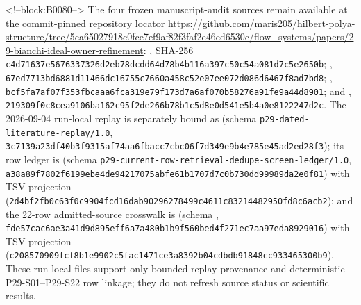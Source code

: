 \documentclass[11pt,a4paper]{article}
\begin{document}
<!--block:B0080-->
\begingroup\sloppy
The four frozen manuscript-audit sources remain available at the commit-pinned repository locator \url{https://github.com/maris205/hilbert-polya-structure/tree/5ca65027918c0fce7ef9af82f3faf2e46ed6530c/flow_systems/papers/29-bianchi-ideal-owner-refinement}: , SHA-256 \texttt{c4d71637\allowbreak{}e5676337\allowbreak{}326d2eb7\allowbreak{}8dcdd64d\allowbreak{}78b4b116\allowbreak{}a397c50c\allowbreak{}54a081d7\allowbreak{}c5e2650b}; , \texttt{67ed7713\allowbreak{}bd6881d1\allowbreak{}1466dc16\allowbreak{}755c7660\allowbreak{}a458c52e\allowbreak{}07ee072d\allowbreak{}086d6467\allowbreak{}f8ad7bd8}; , \texttt{bcf5fa7a\allowbreak{}f07f353f\allowbreak{}bcaaa6fc\allowbreak{}a319e79f\allowbreak{}173d7a6a\allowbreak{}f070b582\allowbreak{}76a91fe9\allowbreak{}a44d8901}; and , \texttt{219309f0\allowbreak{}c8cea910\allowbreak{}6ba162c9\allowbreak{}5f2de266\allowbreak{}b78b1c5d\allowbreak{}8e0d541e\allowbreak{}5b4a0e81\allowbreak{}22247d2c}. The 2026-09-04 run-local replay is separately bound as  (schema \texttt{p29-dated-literature-replay/1.0}, \texttt{3c7139a2\allowbreak{}3df40b3f\allowbreak{}9315af74\allowbreak{}aa6fbacc\allowbreak{}7cbc06f7\allowbreak{}d349e9b4\allowbreak{}e785e45a\allowbreak{}d2ed28f3}); its row ledger is  (schema \texttt{p29-current-row-retrieval-dedupe-screen-ledger/1.0}, \texttt{a38a89f7\allowbreak{}802f6199\allowbreak{}ebe4de94\allowbreak{}217075ab\allowbreak{}fe61b170\allowbreak{}7d7c0b73\allowbreak{}0dd99989\allowbreak{}da2e0f81}) with TSV projection  (\texttt{2d4bf2fb\allowbreak{}0c63f0c9\allowbreak{}904fcd16\allowbreak{}dab90296\allowbreak{}278499c4\allowbreak{}611c8321\allowbreak{}4482950f\allowbreak{}d8c6acb2}); and the 22-row admitted-source crosswalk is  (schema , \texttt{fde57cac\allowbreak{}6ae3a41d\allowbreak{}9d895eff\allowbreak{}6a7a480b\allowbreak{}1b9f560b\allowbreak{}ed4f271e\allowbreak{}c7aa97ed\allowbreak{}a8929016}) with TSV projection  (\texttt{c2085709\allowbreak{}09fcf8b1\allowbreak{}e9902c5f\allowbreak{}ac1471ce\allowbreak{}3a8392b0\allowbreak{}4cdbdb91\allowbreak{}848cc933\allowbreak{}465300b9}). These run-local files support only bounded replay provenance and deterministic P29-S01--P29-S22 row linkage; they do not refresh source status or scientific results.\par\endgroup
\end{document}
